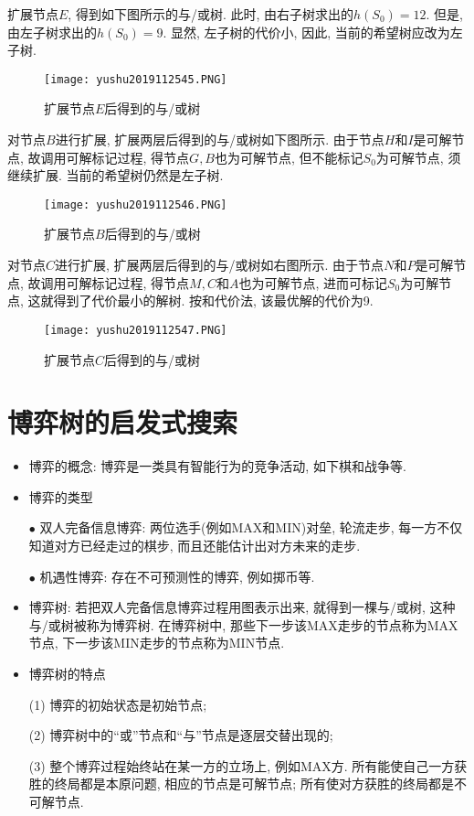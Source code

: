扩展节点$E$, 得到如下图所示的与/或树.
此时, 由右子树求出的$h(S_0)=12$. 但是, 由左子树求出的$h(S_0)=9$.
显然, 左子树的代价小, 因此, 当前的希望树应改为左子树.
\begin{figure}[H]
    \centering
    \texttt{[image: yushu2019112545.PNG]}
    \caption{扩展节点$E$后得到的与/或树}
    \label{AI32fig45}
\end{figure}
对节点$B$进行扩展, 扩展两层后得到的与/或树如下图所示.
由于节点$H$和$I$是可解节点, 故调用可解标记过程, 得节点$G,B$也为可解节点, 但不能标记$S_0$为可解节点, 须继续扩展. 当前的希望树仍然是左子树.
\begin{figure}[H]
    \centering
    \texttt{[image: yushu2019112546.PNG]}
    \caption{扩展节点$B$后得到的与/或树}
    \label{AI32fig46}
\end{figure}
对节点$C$进行扩展, 扩展两层后得到的与/或树如右图所示.
由于节点$N$和$P$是可解节点, 故调用可解标记过程, 得节点$M,C$和$A$也为可解节点, 进而可标记$S_0$为可解节点, 这就得到了代价最小的解树. 按和代价法, 该最优解的代价为9.
\begin{figure}[H]
    \centering
    \texttt{[image: yushu2019112547.PNG]}
    \caption{扩展节点$C$后得到的与/或树}
    \label{AI32fig47}
\end{figure}
\section{博弈树的启发式搜索}
\begin{itemize}
\item 博弈的概念: 博弈是一类具有智能行为的竞争活动, 如下棋和战争等.
\item 博弈的类型

$\bullet$ 双人完备信息博弈: 两位选手(例如MAX和MIN)对垒, 轮流走步, 每一方不仅知道对方已经走过的棋步, 而且还能估计出对方未来的走步.

$\bullet$ 机遇性博弈: 存在不可预测性的博弈, 例如掷币等.
\item 博弈树: 若把双人完备信息博弈过程用图表示出来, 就得到一棵与/或树, 这种与/或树被称为博弈树. 在博弈树中, 那些下一步该MAX走步的节点称为MAX节点, 下一步该MIN走步的节点称为MIN节点.
\item 博弈树的特点

(1) 博弈的初始状态是初始节点;

(2) 博弈树中的“或”节点和“与”节点是逐层交替出现的;

(3) 整个博弈过程始终站在某一方的立场上, 例如MAX方. 所有能使自己一方获胜的终局都是本原问题, 相应的节点是可解节点; 所有使对方获胜的终局都是不可解节点.
\end{itemize}


